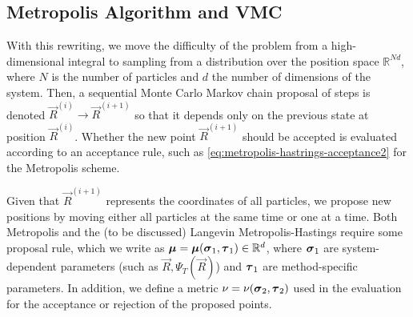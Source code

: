 \subsection{Metropolis Algorithm and VMC}

With this rewriting, we move the difficulty of the problem from a high-dimensional integral to sampling from a distribution over the position space $\mathbb{R}^{Nd}$, where $N$ is the number of particles and $d$ the number of dimensions of the system. Then, a sequential Monte Carlo Markov chain proposal of steps is denoted $\Vec{R}^{(i)} \to \Vec{R}^{(i+1)}$ so that it depends only on the previous state at position $\Vec{R}^{(i)}$. Whether the new point $\Vec{R}^{(i+1)}$ should be accepted is evaluated according to an acceptance rule, such as \eqref{eq:metropolis-hastrings-acceptance2} for the Metropolis scheme. 

Given that $\Vec{R}^{(i+1)}$ represents the coordinates of all particles,  we propose new positions by moving either all particles at the same time or one at a time. Both Metropolis and the (to be discussed) Langevin Metropolis-Hastings require some proposal rule, which we write as $\boldsymbol{\mu} = \boldsymbol{\mu}(\boldsymbol{\sigma}_1, \boldsymbol{\tau}_1) \in \mathbb{R}^d$, where $\boldsymbol{\sigma}_1$ are system-dependent parameters (such as $\Vec{R}, \Psi_T(\Vec{R})$) and $\boldsymbol{\tau}_1$ are method-specific parameters. In addition, we define a metric $\nu = \nu(\boldsymbol{\sigma}_2, \boldsymbol{\tau}_2)$ used in the evaluation for the acceptance or rejection of the proposed points.


